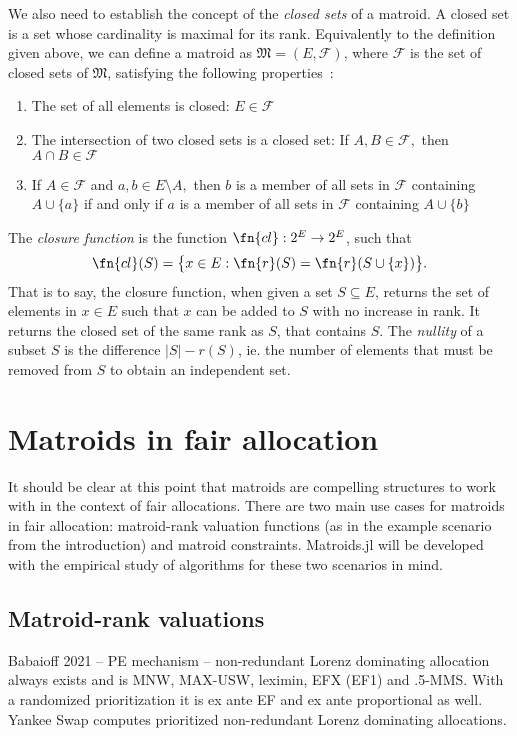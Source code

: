 We also need to establish the concept of the \textit{closed sets} of a matroid. A closed set is a set whose cardinality is maximal for its rank. Equivalently to the definition given above, we can define a matroid as $\mathfrak{M} = (E, \mathcal{F})$, where $\mathcal{F}$ is the set of closed sets of $\mathfrak{M}$, satisfying the following properties~\cite{knuth-1975}:

\begin{enumerate}
  \item The set of all elements is closed: $E \in \mathcal{F}$
  \item The intersection of two closed sets is a closed set: If $A,B \in \mathcal{F},$ then $A \cap B \in \mathcal{F}$
  \item If $A \in \mathcal{F}$ and $a,b \in E \setminus A,$ then $b$ is a member of all sets in $\mathcal{F}$ containing $A \cup \{a\}$ if and only if $a$ is a member of all sets in $\mathcal{F}$ containing $A \cup \{b\}$
\end{enumerate}

The \textit{closure function} is the function $\fn{cl} : 2^E \to 2^E$, such that $$\fn{cl}(S) = \bigl\{ x \in E : \fn{r}(S) = \fn{r}(S \cup \{x\}) \bigr\}.$$ That is to say, the closure function, when given a set $S \subseteq E$, returns the set of elements in $x \in E$ such that $x$ can be added to $S$ with no increase in rank. It returns the closed set of the same rank as $S$, that contains $S$. The \textit{nullity} of a subset $S$ is the difference $|S| - r(S)$, ie. the number of elements that must be removed from $S$ to obtain an independent set.


\section{Matroids in fair allocation}
It should be clear at this point that matroids are compelling structures to work with in the context of fair allocations. There are two main use cases for matroids in fair allocation: matroid-rank valuation functions (as in the example scenario from the introduction) and matroid constraints. Matroids.jl will be developed with the empirical study of algorithms for these two scenarios in mind.

\subsection{Matroid-rank valuations}

Babaioff 2021 -- PE mechanism -- non-redundant Lorenz dominating allocation always exists and is MNW, MAX-USW, leximin, EFX (EF1) and .5-MMS. With a randomized prioritization it is ex ante EF and ex ante proportional as well. Yankee Swap computes prioritized non-redundant Lorenz dominating allocations.

